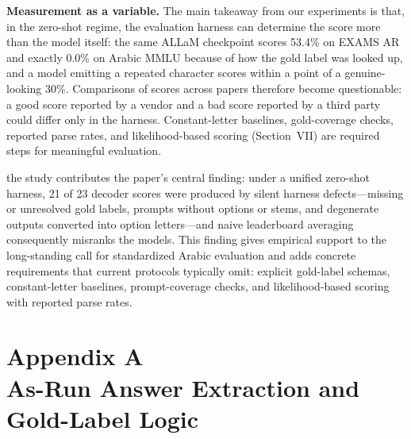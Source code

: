\textbf{Measurement as a variable.} The main takeaway from our experiments is that, in
the zero-shot regime, the evaluation harness can determine the score more than the model
itself: the same ALLaM checkpoint scores 53.4\% on EXAMS AR and exactly 0.0\% on Arabic
MMLU because of how the gold label was looked up, and a model emitting a repeated
character scores within a point of a genuine-looking 30\%. Comparisons of scores across
papers therefore become questionable: a good score reported by a vendor and a bad score
reported by a third party could differ only in the harness. Constant-letter baselines,
gold-coverage checks, reported parse rates, and likelihood-based scoring
(Section~VII) are required steps for meaningful evaluation.

the study contributes the paper's central finding: under a unified zero-shot harness,
21 of 23 decoder scores were produced by silent harness defects---missing or unresolved
gold labels, prompts without options or stems, and degenerate outputs converted into
option letters---and naive leaderboard averaging consequently misranks the models.
This finding gives empirical support to the long-standing call for standardized Arabic
evaluation and adds concrete requirements that current protocols typically omit:
explicit gold-label schemas, constant-letter baselines, prompt-coverage checks, and
likelihood-based scoring with reported parse rates.

\section*{Appendix A\\As-Run Answer Extraction and Gold-Label Logic}

